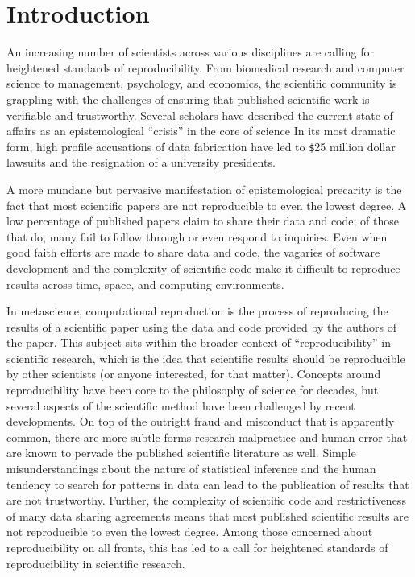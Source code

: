 
\hypertarget{introduction}{%
\section{Introduction}\label{introduction}}

An increasing number of scientists across various disciplines are calling for heightened standards of reproducibility. From biomedical research and computer science to management, psychology, and economics, the scientific community is grappling with the challenges of ensuring that published scientific work is verifiable and trustworthy. Several scholars have described the current state of affairs as an epistemological ``crisis'' in the core of science\linebreak
In its most dramatic form, high profile accusations of data fabrication have led to \verb,$,25 million dollar lawsuits and the resignation of a university presidents. 

A more mundane but pervasive manifestation of epistemological precarity is the fact that most scientific papers are not reproducible to even the lowest degree. A low percentage of published papers claim to share their data and code; of those that do, many fail to follow through or even respond to inquiries. Even when good faith efforts are made to share data and code, the vagaries of software development and the complexity of scientific code make it difficult to reproduce results across time, space, and computing environments.
 

In metascience, computational reproduction is the process of reproducing the results of a scientific paper using the data and code provided by the authors of the paper. This subject sits within the broader context of ``reproducibility'' in scientific  research, which is the idea that scientific results should be reproducible by other scientists (or anyone interested, for that matter). Concepts around reproducibility have been core to the philosophy of science for decades, but several aspects of the scientific method have been challenged by recent developments. On top of the outright fraud and misconduct that is apparently common, there are more subtle forms research malpractice and human error that are known to pervade the published scientific literature as well. Simple misunderstandings about the nature of statistical inference and the human tendency to search for patterns in data can lead to the publication of results that are not trustworthy. Further, the complexity of scientific code and restrictiveness of many data sharing agreements means that most published scientific results are not reproducible to even the lowest degree. 
Among those concerned about reproducibility on all fronts, this has led to a call for heightened standards of reproducibility in scientific research. 

